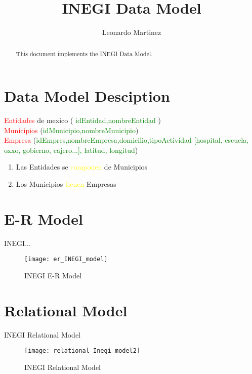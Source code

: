 \documentclass[10pt]{article}         %
\title{INEGI Data Model}
\author{Leonardo Martinez}
\begin{document}
\maketitle

\begin{abstract}
This document implements the INEGI Data Model.
\end{abstract}

\section{Data Model Desciption}


\textcolor{red}{Entidades} de mexico ( \textcolor{green}{idEntidad,nombreEntidad} )\\
\textcolor{red}{Municipios} (\textcolor{green}{idMunicipio,nombreMunicipio})\\
\textcolor{red}{Empresa} (\textcolor{green}{idEmpres,nombreEmpresa,domicilio,tipoActividad [hospital, escuela, oxxo, gobierno, cajero...], latitud, longitud})\\

\begin{enumerate}
\item
Las Entidades se \textcolor{yellow}{componen} de Municipios \\
\item
Los Municipios \textcolor{yellow}{tienen} Empresas\\
\end{enumerate}


\section{E-R Model}

INEGI...

\begin{figure}[b]
     \texttt{[image: er\_INEGI\_model]}
     \caption{INEGI E-R Model}
\end{figure}
   
\section{Relational Model}
INEGI Relational Model

\begin{figure}[b]
     \texttt{[image: relational\_Inegi\_model2]}
     \caption{INEGI Relational Model}
\end{figure}
\end{document}
